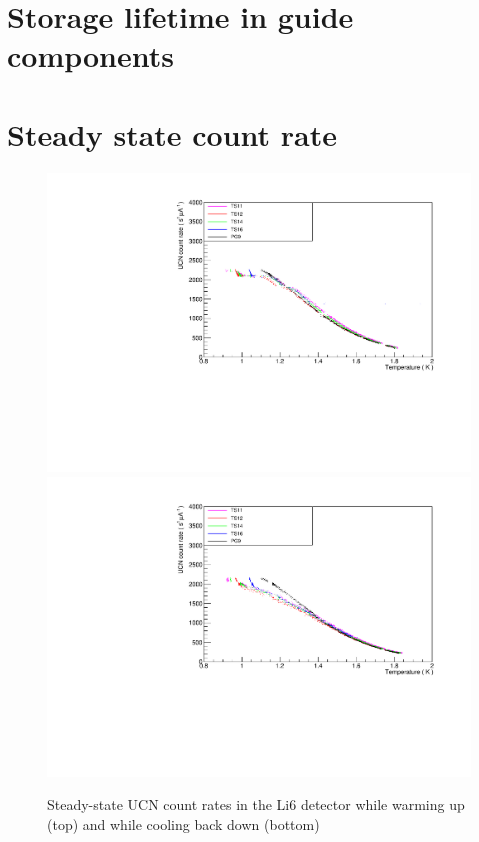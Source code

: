 \documentclass[10pt,letterpaper]{article}
\begin{document}
\fi

\section{Storage lifetime in guide components}




\section{Steady state count rate}

\begin{figure}
\centering
\includegraphics[width=\textwidth,page=1]{../steady_state/li6RateVsTempRun1162.pdf}
\includegraphics[width=\textwidth,page=1]{../steady_state/li6RateVsTempRun1163.pdf}
\caption{Steady-state UCN count rates in the Li6 detector while warming up (top) and while cooling back down (bottom)}
\label{fig:steadystate}
\end{figure}
\end{document}
